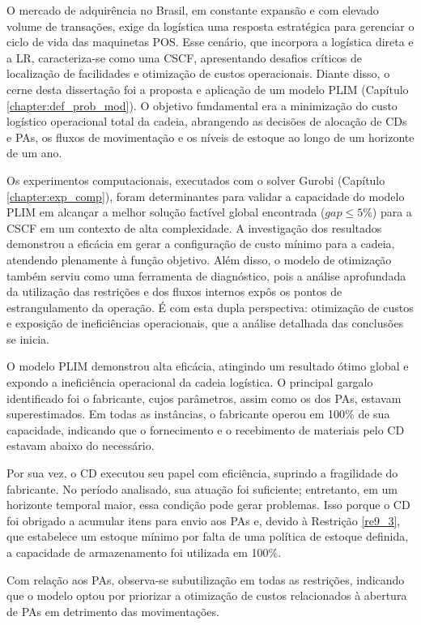 O mercado de adquirência no Brasil, em constante expansão e com elevado volume de transações, exige da logística uma resposta estratégica para gerenciar o ciclo de vida das maquinetas POS. Esse cenário, que incorpora a logística direta e a LR, caracteriza-se como uma CSCF, apresentando desafios críticos de localização de facilidades e otimização de custos operacionais. Diante disso, o cerne desta dissertação foi a proposta e aplicação de um modelo PLIM (Capítulo \ref{chapter:def_prob_mod}). O objetivo fundamental era a minimização do custo logístico operacional total da cadeia, abrangendo as decisões de alocação de CDs e PAs, os fluxos de movimentação e os níveis de estoque ao longo de um horizonte de um ano.

Os experimentos computacionais, executados com o solver Gurobi (Capítulo \ref{chapter:exp_comp}), foram determinantes para validar a capacidade do modelo PLIM em alcançar a melhor solução factível global encontrada ($gap \leq 5\%$) para a CSCF em um contexto de alta complexidade. A investigação dos resultados demonstrou a eficácia em gerar a configuração de custo mínimo para a cadeia, atendendo plenamente à função objetivo. Além disso, o modelo de otimização também serviu como uma ferramenta de diagnóstico, pois a análise aprofundada da utilização das restrições e dos fluxos internos expôs os pontos de estrangulamento da operação. É com esta dupla perspectiva: otimização de custos e exposição de ineficiências operacionais, que a análise detalhada das conclusões se inicia.

O modelo PLIM demonstrou alta eficácia, atingindo um resultado ótimo global e expondo a ineficiência operacional da cadeia logística. O principal gargalo identificado foi o fabricante, cujos parâmetros, assim como os dos PAs, estavam superestimados. Em todas as instâncias, o fabricante operou em 100\% de sua capacidade, indicando que o fornecimento e o recebimento de materiais pelo CD estavam abaixo do necessário.

Por sua vez, o CD executou seu papel com eficiência, suprindo a fragilidade do fabricante. No período analisado, sua atuação foi suficiente; entretanto, em um horizonte temporal maior, essa condição pode gerar problemas. Isso porque o CD foi obrigado a acumular itens para envio aos PAs e, devido à Restrição \ref{re9_3}, que estabelece um estoque mínimo por falta de uma política de estoque definida, a capacidade de armazenamento foi utilizada em 100\%.

Com relação aos PAs, observa-se subutilização em todas as restrições, indicando que o modelo optou por priorizar a otimização de custos relacionados à abertura de PAs em detrimento das movimentações. 

